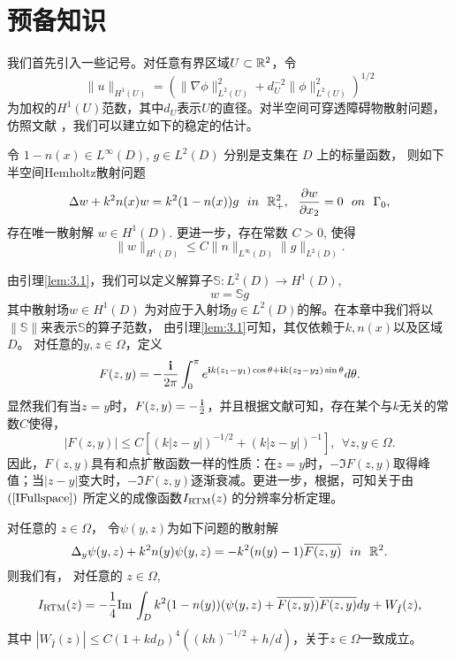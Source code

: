 \section{预备知识}
我们首先引入一些记号。对任意有界区域$U\subset\R^2$，令
\begin{equation*}
\|u\|_{H^1(U)}=
(\|\nabla\phi\|_{L^2(U)}^2+d_U^{-2}\|\phi\|^2_{L^2(U)})^{1/2}
\end{equation*}
为加权的$H^1(U)$范数，其中$d_U$表示$U$的直径。对半空间可穿透障碍物散射问题，仿照文献 \cite[Theorem 5.26]{cc14}，我们可以建立如下的稳定的估计。
\begin{lemma}[稳定性估计]\label{lem:3.1}
令 $1-n(x)\in L^{\infty}(D)$, $g\in L^2(D)$ 分别是支集在 $D$ 上的标量函数， 则如下半空间Hemholtz散射问题
\begin{equation}\label{forward}
  \Delta w+k^2n(x)w=k^2(1-n(x))g\  \ in\  \ \R^2_+, \  \ \frac{\partial w}{\partial x_2}=0\  \  on\  \  \Gamma_0,
\end{equation}
存在唯一散射解 $w\in H^1(D)$. 更进一步，存在常数 $C>0$, 使得
\begin{equation}
    \|w\|_{H^1(D)}\leq C\|n\|_{L^{\infty}(D)}\|g\|_{L^2(D)}.
\end{equation}
\end{lemma}
由引理\ref{lem:3.1}，我们可以定义解算子$\mathbb{S}:L^2(D)\rightarrow H^1(D)$,
\begin{equation*}
  w=\mathbb{S} g
\end{equation*}
其中散射场$w\in H^1(D)$ 为对应于入射场$g\in L^2(D)$的解。在本章中我们将以$\|\mathbb{S}\|$来表示$\mathbb{S}$的算子范数，
由引理\ref{lem:3.1}可知，其仅依赖于$k,n(x)$以及区域$D$。
对任意的$y,z\in\Omega$，定义
\begin{equation*}
    F(z,y)=-\frac{\ii}{2\pi}\int_0^{\pi}e^{\i k(z_1-y_1)\cos\theta+\i k(z_2-y_2)\sin\theta}d\theta.
\end{equation*}
显然我们有当$z=y$时，$F(z,y)=-\frac{\i}{2}$，并且根据文献\cite[Lemma 3.3]{ch_ha}可知，存在某个与$k$无关的常数$C$使得，
\begin{equation}\label{a1}
|F(z,y)|\leq C[(k|z-y|)^{-1/2}+(k|z-y|)^{-1}],\ \ \forall z,y\in\Omega.
\end{equation}
因此，$F(z,y)$具有和点扩散函数一样的性质：在$z=y$时，$-\Im F(z,y)$取得峰值；当$|z-y|$变大时，$-\Im F(z,y)$逐渐衰减。更进一步，根据\cite[Theorem 5.2]{ch_ha}，可知关于由$(\ref{IFullspace})$ 所定义的成像函数$I_{\rm RTM}(z)$ 的分辨率分析定理。
\begin{theorem}\label{thm:3.1}
对任意的 $z\in\Omega$， 令$\psi(y,z)$为如下问题的散射解 $$
\Delta_y\psi(y,z)+k^2n(y)\psi(y,z)=-k^2(n(y)-1)\overline{F(z,y)}\ \ in\ \ \R^2.$$
则我们有， 对任意的 $z\in\Omega$,$$
I_{\rm RTM}(z)=-\frac{1}{4}\Im\int_Dk^2(1-n(y))(\psi(y,z)+\overline{F(z,y)})\overline{F(z,y)}dy+W_{\hat{I}}(z),$$
其中 $\left|W_{\hat{I}}(z)\right|\leq C(1+kd_D)^4((kh)^{-1/2}+h/d)$，关于$z\in\Omega$一致成立。
\end{theorem}
